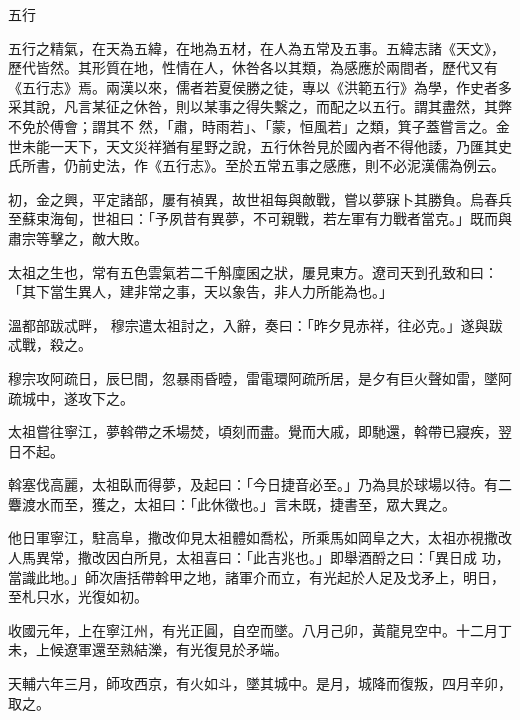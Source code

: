 
\begin{pinyinscope}

 五行



 五行之精氣，在天為五緯，在地為五材，在人為五常及五事。五緯志諸《天文》，歷代皆然。其形質在地，性情在人，休咎各以其類，為感應於兩間者，歷代又有《五行志》焉。兩漢以來，儒者若夏侯勝之徒，專以《洪範五行》為學，作史者多采其說，凡言某征之休咎，則以某事之得失繫之，而配之以五行。謂其盡然，其弊不免於傅會；謂其不
 然，「肅，時雨若」、「蒙，恒風若」之類，箕子蓋嘗言之。金世未能一天下，天文災祥猶有星野之說，五行休咎見於國內者不得他諉，乃匯其史氏所書，仍前史法，作《五行志》。至於五常五事之感應，則不必泥漢儒為例云。



 初，金之興，平定諸部，屢有禎異，故世祖每與敵戰，嘗以夢寐卜其勝負。烏春兵至蘇束海甸，世祖曰：「予夙昔有異夢，不可親戰，若左軍有力戰者當克。」既而與肅宗等擊之，敵大敗。



 太祖之生也，常有五色雲氣若二千斛廩囷之狀，屢見東方。遼司天到孔致和曰：「其下當生異人，建非常之事，天以象告，非人力所能為也。」



 溫都部跋忒畔，
 穆宗遣太祖討之，入辭，奏曰：「昨夕見赤祥，往必克。」遂與跋忒戰，殺之。



 穆宗攻阿疏日，辰巳間，忽暴雨昏曀，雷電環阿疏所居，是夕有巨火聲如雷，墜阿疏城中，遂攻下之。



 太祖嘗往寧江，夢斡帶之禾場焚，頃刻而盡。覺而大戚，即馳還，斡帶已寢疾，翌日不起。



 斡塞伐高麗，太祖臥而得夢，及起曰：「今日捷音必至。」乃為具於球場以待。有二麞渡水而至，獲之，太祖曰：「此休徵也。」言未既，捷書至，眾大異之。



 他日軍寧江，駐高阜，撒改仰見太祖體如喬松，所乘馬如岡阜之大，太祖亦視撒改人馬異常，撒改因白所見，太祖喜曰：「此吉兆也。」即舉酒酹之曰：「異日成
 功，當識此地。」師次唐括帶斡甲之地，諸軍介而立，有光起於人足及戈矛上，明日，至札只水，光復如初。



 收國元年，上在寧江州，有光正圓，自空而墜。八月己卯，黃龍見空中。十二月丁未，上候遼軍還至熟結濼，有光復見於矛端。



 天輔六年三月，師攻西京，有火如斗，墜其城中。是月，城降而復叛，四月辛卯，取之。




\end{pinyinscope}
